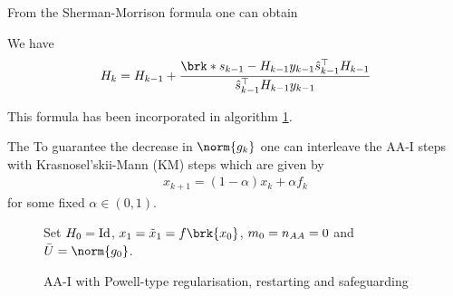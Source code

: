 From the Sherman-Morrison formula one can obtain
\begin{proposition}
	We have
	\begin{align*}
		H_{k} = H_{k-1}+\frac{\brk*{s_{k-1}-H_{k-1}y_{k-1}}\hs_{k-1}^\top H_{k-1}}{\hs_{k-1}^\top H_{k-1}y_{k-1}}
	\end{align*}
\end{proposition}
This formula has been incorporated in algorithm \ref{alg:aa1-prs}.

The 
To guarantee the decrease in $\norm{g_k}$ one can interleave the AA-I steps with Krasnosel'skii-Mann (KM) steps which are given by
\begin{align*}
	x_{k+1}= (1-\alpha)x_k +\alpha f_k
\end{align*}
for some fixed $\alpha\in(0,1)$.

\begin{figure}[h]
\centering
\begin{algorithm}[H]
\caption{AA-I with Powell-type regularisation, restarting and safeguarding}\label{alg:aa1-prs}

\BlankLine
Set $H_0=\operatorname{Id}$, $x_1={\black\tix_1=f\brk{x_0}}$, $m_0 = {\color{black} n_{AA}=0}$ and ${\black\barU=\norm{g_0}}$.

\end{algorithm}
\end{figure}


